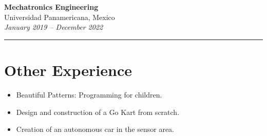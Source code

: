 \documentclass[11pt,a4paper]{article}
\begin{document}
\begin{minipage}[t]{0.65\textwidth}
\vspace{.7em}

\textbf{Mechatronics Engineering} \\
Universidad Panamericana, Mexico \\
\textit{January 2019 -- December 2022}

\vspace*{.7 em}
{\color{lightgray}\hrule}

\section*{Other Experience}
\footnotesize
\begin{itemize}
    \item Beautiful Patterns: Programming for children.
    \item Design and construction of a Go Kart from scratch.
    \item Creation of an autonomous car in the sensor area.
\end{itemize}

\vspace*{\fill}

\end{minipage}
\end{document}

